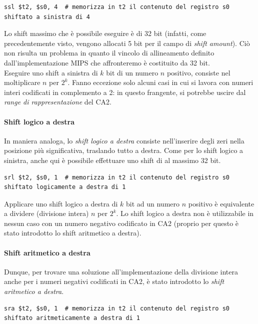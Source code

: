 \documentclass[class=book, crop=false]{standalone}
\begin{document}
\begin{verbatim}
ssl $t2, $s0, 4  # memorizza in t2 il contenuto del registro s0 shiftato a sinistra di 4
\end{verbatim}

Lo shift massimo che è possibile eseguire è di 32 bit (infatti, come precedentemente visto, vengono allocati 5 bit per il campo di \emph{shift amount}). Ciò non risulta un problema in quanto il vincolo di allineamento definito dall'implementazione MIPS che affronteremo è costituito da 32 bit.\\
Eseguire uno shift a sinistra di \(k\) bit di un numero \(n\) positivo, consiste nel moltiplicare \(n\) per \(2^k\). Fanno eccezione solo alcuni casi in cui si lavora con numeri interi codificati in complemento a 2: in questo frangente, si potrebbe uscire dal \emph{range di rappresentazione} del CA2.

\paragraph{Shift logico a destra}
In maniera analoga, lo \emph{shift logico a destra} consiste nell'inserire degli zeri nella posizione più significativa, traslando tutto a destra. Come per lo shift logico a sinistra, anche qui è possibile effettuare uno shift di al massimo 32 bit.

\begin{verbatim}
srl $t2, $s0, 1  # memorizza in t2 il contenuto del registro s0 shiftato logicamente a destra di 1
\end{verbatim}

Applicare uno shift logico a destra di \(k\) bit ad un numero \(n\) positivo è equivalente a dividere (divisione intera) \(n\) per \(2^k\). Lo shift logico a destra non è utilizzabile in nessun caso con un numero negativo codificato in CA2 (proprio per questo è stato introdotto lo shift aritmetico a destra).

\paragraph{Shift aritmetico a destra}
Dunque, per trovare una soluzione all'implementazione della divisione intera anche per i numeri negativi codificati in CA2, è stato introdotto lo \emph{shift aritmetico a destra}.

\begin{verbatim}
sra $t2, $s0, 1  # memorizza in t2 il contenuto del registro s0 shiftato aritmeticamente a destra di 1
\end{verbatim}
\end{document}
